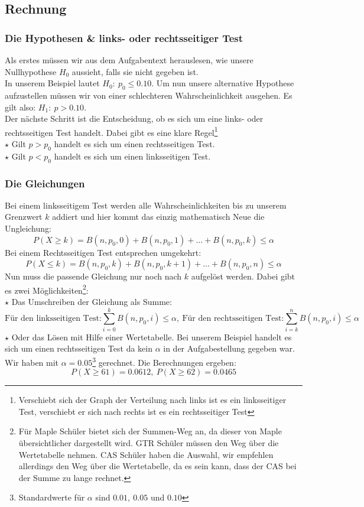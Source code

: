 \subsection{Rechnung}
\subsubsection{Die Hypothesen \& links- oder rechtsseitiger Test}
Als erstes müssen wir aus dem Aufgabentext herauslesen, wie unsere Nullhypothese $H_0$ aussieht, falls sie nicht gegeben ist.\\
In unserem Beispiel lautet $H_0:\ p_0\leq 0.10$. Um nun unsere alternative Hypothese aufzustellen müssen wir von einer schlechteren Wahrscheinlichkeit ausgehen. Es gilt also: $H_1:\ p>0.10$.\\
Der nächste Schritt ist die Entscheidung, ob es sich um eine links- oder rechtsseitigen Test handelt. Dabei gibt es eine klare Regel\footnote{Verschiebt sich der Graph der Verteilung nach links ist es ein linksseitiger Test, verschiebt er sich nach rechts ist es ein rechtsseitiger Test}\\
$\star$ Gilt $p>p_0$ handelt es sich um einen rechtsseitigen Test.\\
$\star$ Gilt $p<p_0$ handelt es sich um einen linksseitigen Test.\\
\subsubsection{Die Gleichungen}
Bei einem linksseitigem Test werden alle Wahrscheinlichkeiten bis zu unserem Grenzwert $k$ addiert und hier kommt das einzig mathematisch Neue die Ungleichung:
\[P(X\geq k)=B(n,p_0,0)+B(n,p_0,1)+\ldots+B(n,p_0,k) \leq \alpha\]
Bei einem Rechtsseitigen Test entsprechen umgekehrt:
\[P(X\leq k)=B(n,p_0,k)+B(n,p_0,k+1)+\ldots+B(n,p_0,n) \leq \alpha\]
Nun muss die passende Gleichung nur noch nach $k$ aufgelöst werden. Dabei gibt es zwei Möglichkeiten\footnote{Für Maple Schüler bietet sich der Summen-Weg an, da dieser von Maple übersichtlicher dargestellt wird. GTR Schüler müssen den Weg über die Wertetabelle nehmen. CAS Schüler haben die Auswahl, wir empfehlen allerdings den Weg über die Wertetabelle, da es sein kann, dass der CAS bei der Summe zu lange rechnet.}:\\
$\star$ Das Umschreiben der Gleichung als Summe:
\[\text{Für den linksseitigen Test:}\sum_{i=0}^{k}B(n,p_0,i)\leq \alpha,\ \text{Für den rechtsseitigen Test:}\sum_{i=k}^{n}B(n,p_0,i)\leq \alpha\]
$\star$ Oder das Lösen mit Hilfe einer Wertetabelle.
Bei unserem Beispiel handelt es sich um einen rechtsseitigen Test da kein $\alpha$ in der Aufgabestellung gegeben war. Wir haben mit $\alpha=0.05$\footnote{Standardwerte für $\alpha$ sind $0.01,\ 0.05$ und $0.10$} gerechnet. Die Berechnungen ergeben:
\[P(X\geq 61)=0.0612,\ P(X\geq 62)=0.0465\] 
